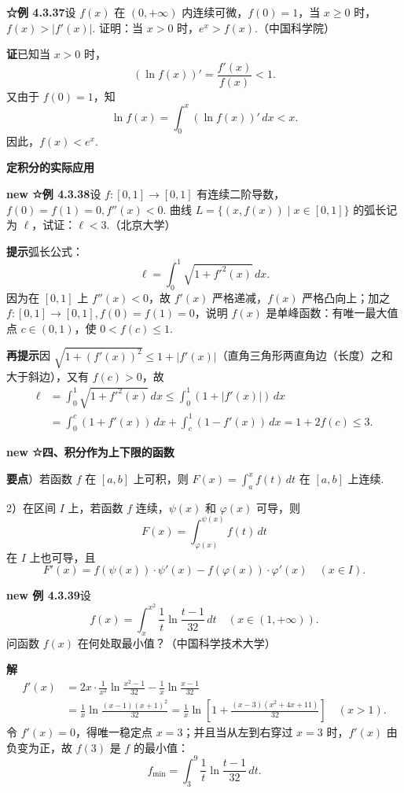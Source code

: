 \documentclass[UTF8,12pt,a4paper,fontset=fandol]{ctexart}
\begin{document}
\noindent\textbf{☆例 4.3.37}\quad 设 $f(x)$ 在 $(0,+\infty)$ 内连续可微，$f(0)=1$，当 $x\ge0$ 时，$f(x)>|f'(x)|$. 证明：当 $x>0$ 时，$e^x>f(x)$.（中国科学院）

\noindent\textbf{证}\quad 已知当 $x>0$ 时，
\[
(\ln f(x))'=\frac{f'(x)}{f(x)}<1.
\]
又由于 $f(0)=1$，知
\[
\ln f(x)=\int_0^x(\ln f(x))'\,dx<x.
\]
因此，$f(x)<e^x$.

\noindent\textbf{定积分的实际应用}

\noindent\textbf{new ☆例 4.3.38}\quad 设 $f:[0,1]\to[0,1]$ 有连续二阶导数，$f(0)=f(1)=0,f''(x)<0$. 曲线 $L=\{(x,f(x))\mid x\in[0,1]\}$ 的弧长记为 $\ell$，试证：$\ell<3$.（北京大学）

\noindent\textbf{提示}\quad 弧长公式：
\[
\ell=\int_0^1\sqrt{1+f'^2(x)}\,dx.
\]
因为在 $[0,1]$ 上 $f''(x)<0$，故 $f'(x)$ 严格递减，$f(x)$ 严格凸向上；加之 $f:[0,1]\to[0,1],f(0)=f(1)=0$，说明 $f(x)$ 是单峰函数：有唯一最大值点 $c\in(0,1)$，使 $0<f(c)\le1$.

\noindent\textbf{再提示}\quad 因 $\sqrt{1+(f'(x))^2}\le1+|f'(x)|$（直角三角形两直角边（长度）之和大于斜边），又有 $f(c)>0$，故
\[
\begin{aligned}
\ell
&=\int_0^1\sqrt{1+f'^2(x)}\,dx
\le\int_0^1(1+|f'(x)|)\,dx\\
&=\int_0^c(1+f'(x))\,dx+\int_c^1(1-f'(x))\,dx
=1+2f(c)\le3.
\end{aligned}
\]

\noindent\textbf{new ☆四、积分作为上下限的函数}

\noindent\textbf{要点}）若函数 $f$ 在 $[a,b]$ 上可积，则 $F(x)=\int_a^x f(t)\,dt$ 在 $[a,b]$ 上连续.

2）在区间 $I$ 上，若函数 $f$ 连续，$\psi(x)$ 和 $\varphi(x)$ 可导，则
\[
F(x)=\int_{\varphi(x)}^{\psi(x)} f(t)\,dt
\]
在 $I$ 上也可导，且
\[
F'(x)=f(\psi(x))\cdot\psi'(x)-f(\varphi(x))\cdot\varphi'(x)\quad(x\in I).
\]

\noindent\textbf{new 例 4.3.39}\quad 设
\[
f(x)=\int_x^{x^2}\frac1t\ln\frac{t-1}{32}\,dt\quad(x\in(1,+\infty)).
\]
问函数 $f(x)$ 在何处取最小值？（中国科学技术大学）

\noindent\textbf{解}\quad
\[
\begin{aligned}
f'(x)
&=2x\cdot\frac1{x^2}\ln\frac{x^2-1}{32}
-\frac1x\ln\frac{x-1}{32}\\
&=\frac1x\ln\frac{(x-1)(x+1)^2}{32}
=\frac1x\ln\left[1+\frac{(x-3)(x^2+4x+11)}{32}\right]\quad(x>1).
\end{aligned}
\]
令 $f'(x)=0$，得唯一稳定点 $x=3$；并且当从左到右穿过 $x=3$ 时，$f'(x)$ 由负变为正，故 $f(3)$ 是 $f$ 的最小值：
\[
f_{\min}=\int_3^9\frac1t\ln\frac{t-1}{32}\,dt.
\]
\end{document}
